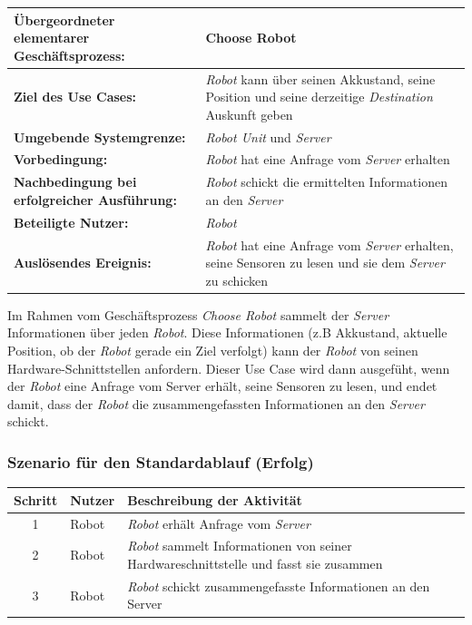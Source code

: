 			\begin{table}[H]
				\centering
				\begin{tabularx}{\textwidth}{|p{5cm}|X|}
				\hline
				\textbf{Übergeordneter elementarer Geschäftsprozess:} & Choose Robot\\ \hline
				\textbf{Ziel des Use Cases:} & \emph{Robot} kann über seinen Akkustand, seine Position und seine derzeitige \emph{Destination} Auskunft geben\\ \hline
				\textbf{Umgebende Systemgrenze:} & \emph{Robot Unit} und \emph{Server} \\ \hline
				\textbf{Vorbedingung:} & \emph{Robot} hat eine Anfrage vom \emph{Server} erhalten \\ \hline
				\textbf{Nachbedingung bei erfolgreicher Ausführung:} & \emph{Robot} schickt die ermittelten Informationen an den \emph{Server} \\ \hline
				\textbf{Beteiligte Nutzer:} & \emph{Robot} \\ \hline
				\textbf{Auslösendes Ereignis:} & \emph{Robot} hat eine Anfrage vom \emph{Server} erhalten, seine Sensoren zu lesen und sie dem \emph{Server} zu schicken \\
				\hline
				\end{tabularx}
			\end{table}

			Im Rahmen vom Geschäftsprozess \emph{Choose Robot} sammelt der \emph{Server}
			Informationen über jeden \emph{Robot}. Diese Informationen (z.B
			Akkustand, aktuelle Position, ob der \emph{Robot} gerade ein Ziel verfolgt)
			kann der \emph{Robot} von seinen Hardware-Schnittstellen anfordern. Dieser
			Use Case wird dann ausgefüht, wenn der \emph{Robot} eine Anfrage vom
			Server erhält, seine Sensoren zu lesen, und endet damit, dass der \emph{Robot}
			die zusammengefassten Informationen an den \emph{Server} schickt.

			\subsubsection*{Szenario für den Standardablauf (Erfolg)}

			\begin{table}[H]
				\centering
				\begin{tabularx}{\textwidth}{|c|p{2cm}|X|}
				\hline
				Schritt & Nutzer & Beschreibung der Aktivität \\ \hline
				1 & Robot & \emph{Robot} erhält Anfrage vom \emph{Server} \\
				2 & Robot & \emph{Robot} sammelt Informationen von seiner Hardwareschnittstelle und fasst sie zusammen \\
				3 & Robot & \emph{Robot} schickt zusammengefasste Informationen an den Server \\
				\hline
				\end{tabularx}
			\end{table}

